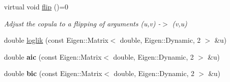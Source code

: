 \begin{DoxyCompactItemize}
\item 
virtual void \hyperlink{classvinecopulib_1_1_bicop_ac8f9520ba401ca554b3e4e2bb4a95cdf}{flip} ()=0\hypertarget{classvinecopulib_1_1_bicop_ac8f9520ba401ca554b3e4e2bb4a95cdf}{}\label{classvinecopulib_1_1_bicop_ac8f9520ba401ca554b3e4e2bb4a95cdf}

\begin{DoxyCompactList}\small\item\em Adjust the copula to a flipping of arguments (u,v) -\/$>$ (v,u) \end{DoxyCompactList}\end{DoxyCompactItemize}
{\bf }\par
\begin{DoxyCompactItemize}
\item 
double \hyperlink{classvinecopulib_1_1_bicop_ae8bcc0c3265cc86565333a0cfd3d619d}{loglik} (const Eigen\+::\+Matrix$<$ double, Eigen\+::\+Dynamic, 2 $>$ \&u)
\item 
double {\bfseries aic} (const Eigen\+::\+Matrix$<$ double, Eigen\+::\+Dynamic, 2 $>$ \&u)\hypertarget{classvinecopulib_1_1_bicop_a9287fec95519fea64a2ae80f5888c709}{}\label{classvinecopulib_1_1_bicop_a9287fec95519fea64a2ae80f5888c709}

\item 
double {\bfseries bic} (const Eigen\+::\+Matrix$<$ double, Eigen\+::\+Dynamic, 2 $>$ \&u)\hypertarget{classvinecopulib_1_1_bicop_ac1f480d13b3464260c2dd6aa88b2e130}{}\label{classvinecopulib_1_1_bicop_ac1f480d13b3464260c2dd6aa88b2e130}

\end{DoxyCompactItemize}


